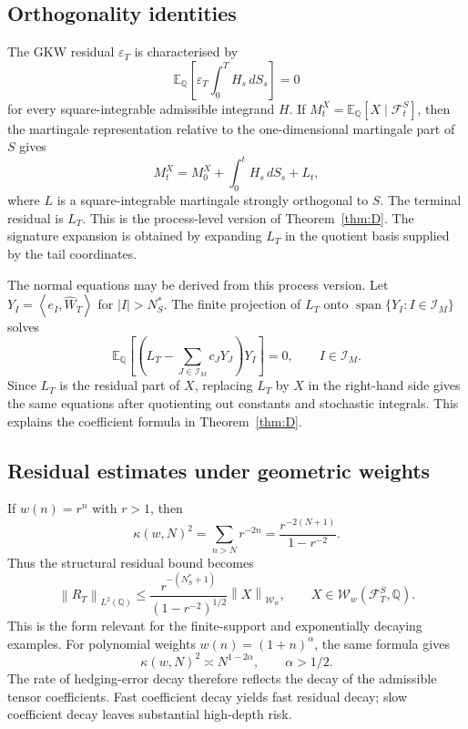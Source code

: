 \documentclass[11pt,oneside]{article}
\theoremstyle{plain}
\theoremstyle{definition}
\theoremstyle{remark}
\newcommand{\E}{\mathbb{E}}
\newcommand{\Q}{\mathbb{Q}}
\newcommand{\cW}{\widehat W}
\newcommand{\FS}{\mathcal F^S}
\newcommand{\norm}[1]{\left\lVert #1\right\rVert}
\newcommand{\inner}[2]{\left\langle #1,#2\right\rangle}
\newcommand{\Span}{\operatorname{span}}
\begin{document}
\subsection{Orthogonality identities}
\label{subsec:orthogonality-identities}
The GKW residual $\varepsilon_T$ is characterised by
\[
\E_\Q\left[\varepsilon_T\int_0^T H_s\,dS_s\right]=0
\]
for every square-integrable admissible integrand $H$. If $M^X_t=\E_\Q[X\mid\FS_t]$, then the martingale representation relative to the one-dimensional martingale part of $S$ gives
\[
M^X_t=M^X_0+\int_0^t H_s\,dS_s+L_t,
\]
where $L$ is a square-integrable martingale strongly orthogonal to $S$. The terminal residual is $L_T$. This is the process-level version of Theorem~\ref{thm:D}. The signature expansion is obtained by expanding $L_T$ in the quotient basis supplied by the tail coordinates.

The normal equations may be derived from this process version. Let $Y_I=\inner{e_I}{\cW_T}$ for $|I|>N_S^\ast$. The finite projection of $L_T$ onto $\Span\{Y_I:I\in\mathcal I_M\}$ solves
\[
\E_\Q\left[(L_T-\sum_{J\in\mathcal I_M}c_JY_J)Y_I\right]=0,
\qquad I\in\mathcal I_M.
\]
Since $L_T$ is the residual part of $X$, replacing $L_T$ by $X$ in the right-hand side gives the same equations after quotienting out constants and stochastic integrals. This explains the coefficient formula in Theorem~\ref{thm:D}.

\subsection{Residual estimates under geometric weights}
\label{subsec:geometric-residual-estimates}
If $w(n)=r^n$ with $r>1$, then
\[
\kappa(w,N)^2=\sum_{n>N}r^{-2n}=\frac{r^{-2(N+1)}}{1-r^{-2}}.
\]
Thus the structural residual bound becomes
\[
\norm{R_T}_{L^2(\Q)}\leq \frac{r^{-(N_S^\ast+1)}}{(1-r^{-2})^{1/2}}\norm{X}_{\mathcal W_w},\qquad X\in\mathcal W_w(\FS_T,\Q).
\]
This is the form relevant for the finite-support and exponentially decaying examples. For polynomial weights $w(n)=(1+n)^\alpha$, the same formula gives
\[
\kappa(w,N)^2\asymp N^{1-2\alpha},\qquad \alpha>1/2.
\]
The rate of hedging-error decay therefore reflects the decay of the admissible tensor coefficients. Fast coefficient decay yields fast residual decay; slow coefficient decay leaves substantial high-depth risk.
\end{document}
